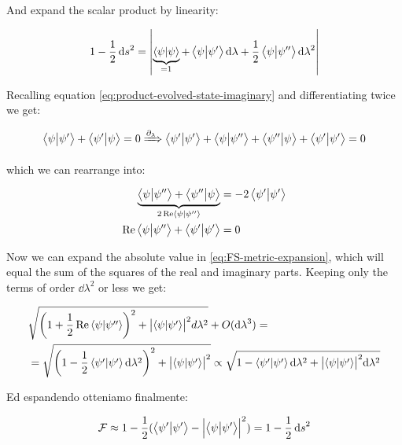 \documentclass[main.tex]{subfiles}
\begin{document}
And expand the scalar product by linearity:

\begin{equation}
1-\frac{1}{2}\dd{s}^2 = \abs{ \underbrace{\braket{\psi}{\psi} }_{=1}+ \braket{\psi}{\psi'}\dd{\lambda} + \frac{1}{2} \braket{\psi}{\psi''}\dd{\lambda}^2 }
\label{eq:FS-metric-expansion}
\end{equation}

Recalling equation \eqref{eq:product-evolved-state-imaginary} and differentiating twice we get:

\begin{equation}
 \braket{\psi}{\psi'} + \braket{\psi'}{\psi} =0 \xRightarrow{\partial_\lambda} \braket{\psi'}{\psi'} + \braket{\psi}{\psi''} + \braket{\psi''}{\psi} + \braket{\psi'}{\psi'} = 0
\end{equation}

which we can rearrange into:

\begin{subequations}
\begin{align}
    \underbrace{\braket{\psi}{\psi''} + \braket{\psi''}{\psi}}_{2\Re\braket{\psi}{\psi''}} &= -2\braket{\psi'}{\psi'} \\
    \Re\braket{\psi}{\psi''} +\braket{\psi'}{\psi'}&=0
\end{align}
\end{subequations}

Now we can expand the absolute value in \eqref{eq:FS-metric-expansion}, which will equal the sum of the squares of the real and imaginary parts. Keeping only the terms of order \(\dd{\lambda}^2\) or less we get:

\begin{subequations}
\begin{align}
&\sqrt{\left(1+\frac{1}{2}\Re\braket{\psi}{\psi''}\right)^2 + \abs{\braket{\psi}{\psi'}}^2 d\lambda^2} + O(\dd\lambda^3) = \\
&= \sqrt{\left(1-\frac{1}{2}\braket{\psi'}{\psi'} \dd\lambda^2\right)^2 + \abs{\braket{\psi}{\psi'}}^2 } \propto \sqrt{1-\braket{\psi'}{\psi' }\dd\lambda^2 + \abs{\braket{\psi}{\psi'}}^2 \dd\lambda^2}
\end{align}
\end{subequations}

Ed espandendo otteniamo finalmente:

\begin{align*}
\mathcal{F} \approx 1-\frac{1}{2}(\braket{\psi'}{\psi'} - \abs{\braket{\psi}{\psi'}}^2) = 1-\frac{1}{2}\dd{s}^2
\end{align*}
\end{document}
